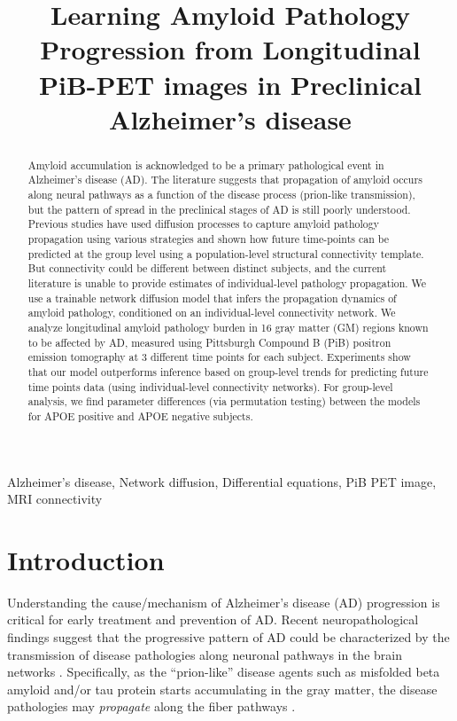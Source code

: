 \documentclass{article}
\title{Learning Amyloid Pathology Progression from Longitudinal PiB-PET images in Preclinical Alzheimer's disease}
\begin{document}
\maketitle


%
%
\begin{abstract}
  Amyloid accumulation is acknowledged to be a primary pathological event in Alzheimer's disease (AD).
  The literature suggests that propagation of amyloid occurs along neural pathways as a
  function of the disease process (prion-like transmission), but the pattern of spread
  in the preclinical stages of AD is still poorly understood.
  Previous studies have used diffusion processes to capture amyloid pathology propagation
  using various strategies and shown how future time-points can be predicted at the group level using a
  population-level structural connectivity template. But connectivity could be
  different between 
  distinct subjects, and the current literature is unable to 
  provide estimates of individual-level pathology propagation. 
  We use a trainable network diffusion model that infers the
  propagation dynamics of amyloid pathology, conditioned on an
  individual-level connectivity network. We analyze
  longitudinal amyloid pathology burden 
  in 16 gray matter (GM) regions known to be affected by AD,
  measured using Pittsburgh Compound B (PiB) positron emission tomography at 3 different time points for
  each subject. Experiments show that our model outperforms inference based on group-level trends
  for predicting future time points data (using individual-level connectivity networks).
  For group-level analysis, we find parameter differences (via permutation testing) between
  the models for APOE positive and APOE negative subjects. 

\end{abstract}
%
\begin{keywords}
Alzheimer's disease, Network diffusion, Differential equations, PiB PET image, MRI connectivity
\end{keywords}
%

\section{Introduction}
\label{sec:intro}
Understanding the cause/mechanism of Alzheimer's disease (AD) progression is critical for early treatment and prevention of AD.
Recent neuropathological findings suggest that the progressive pattern of AD could be characterized by the transmission of disease pathologies along neuronal pathways in the brain networks \cite{villain_2008,kuczynski_2010,lo_2010}. 
Specifically, as the “prion-like” disease agents such as misfolded beta amyloid and/or tau protein starts accumulating in the gray matter, the disease pathologies may
\textit{propagate} along the fiber pathways \cite{seeley_2010}.
\end{document}
